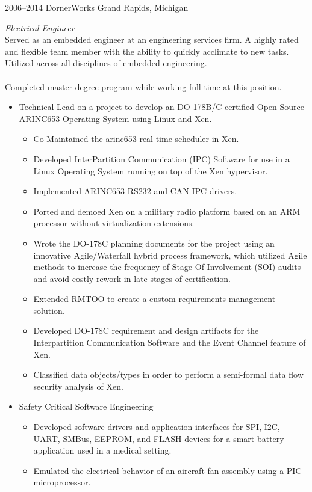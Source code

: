\documentclass[print]{template/friggeri-cv} %
\begin{document}
\begin{entrylist}

\entry
{2006--2014}
{DornerWorks}
{Grand Rapids, Michigan}
{\emph{Electrical Engineer} \\
Served as an embedded engineer at an engineering services firm.  A highly rated and flexible team member with the ability to quickly acclimate to new tasks.  Utilized across all disciplines of embedded engineering.  
\\
\\
Completed master degree program while working full time at this position.
\begin{itemize}
\item Technical Lead on a project to develop an DO-178B/C certified Open Source ARINC653 Operating System using Linux and Xen.
\begin{itemize}
\item Co-Maintained the arinc653 real-time scheduler in Xen.
\item Developed InterPartition Communication (IPC) Software for use in a Linux Operating System running on top of the Xen hypervisor.
\item Implemented ARINC653 RS232 and CAN IPC drivers.
\item Ported and demoed Xen on a military radio platform based on an ARM processor without virtualization extensions.
\item Wrote the DO-178C planning documents for the project using an innovative Agile/Waterfall hybrid process framework, which utilized Agile methods to increase the frequency of Stage Of Involvement (SOI) audits and avoid costly rework in late stages of certification.
\item Extended RMTOO to create a custom requirements management solution.
\item Developed DO-178C requirement and design artifacts for the Interpartition Communication Software and the Event Channel feature of Xen.
\item Classified data objects/types in order to perform a semi-formal data flow security analysis of Xen.
\end{itemize}
\item Safety Critical Software Engineering
\begin{itemize}
\item Developed software drivers and application interfaces for SPI, I2C, UART, SMBus, EEPROM, and FLASH devices for a smart battery application used in a medical setting.
\item Emulated the electrical behavior of an aircraft fan assembly using a PIC microprocessor.

\end{itemize}
\end{itemize}}
\end{entrylist}
\end{document}
